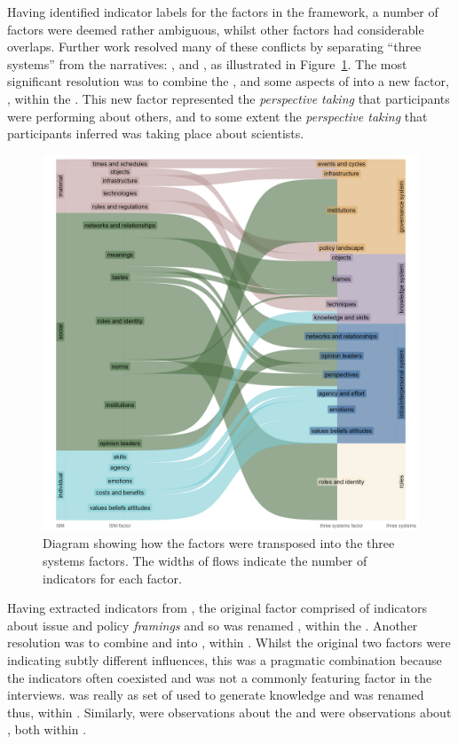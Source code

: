 Having identified indicator labels for the factors in the \ISM{} framework, a number of factors were deemed rather ambiguous, whilst other factors had considerable overlaps. Further work resolved many of these conflicts by separating ``three systems'' from the narratives: \skiinte, \skiknow{} and \skiscip, as illustrated in Figure~\ref{fig:resski}. The most significant resolution was to combine the \ISM{} \ismsn, \ismst{} and some aspects of \ismsm{} into a new factor, \skipers, within the \skiinte. This new factor represented the \emph{perspective taking} that participants were performing about others, and to some extent the \emph{perspective taking} that participants inferred was taking place about scientists. 

\begin{figure}[!ht]
    \centering
    \includegraphics[width=1\linewidth]{figures/ISM_to_threesystems.png}
    \caption{Diagram showing how the \ISM{} factors were transposed into the three systems factors. The widths of flows indicate the number of indicators for each factor.}
    \label{fig:resski}
\end{figure}

Having extracted \skipers{} indicators from \ismsm, the original \ISM{} factor comprised of indicators about issue and policy \emph{framings} and so was renamed \skifram, within the \skiknow. Another resolution was to combine \ISM{} \ismic{} and \ismia{} into \skiagen, within \skiinte. Whilst the original two factors were indicating subtly different influences, this was a pragmatic combination because the indicators often coexisted and \ismic{} was not a commonly featuring factor in the interviews. \ISM{} \ismmt{} was really as set of \skitech{} used to generate knowledge and was renamed thus, within \skiknow. Similarly, \ISM{} \ismmr{} were observations about the \skipoli{} and \ismmts{} were observations about \skieven{}, both within \skiscip.

